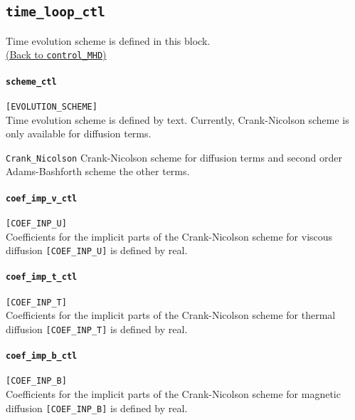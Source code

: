 \subsection{\tt time\_loop\_ctl}
\label{href_t:time_loop_ctl}
Time evolution scheme is defined in this block. \\
\hyperref[href_i:time_loop_ctl]{(Back to {\tt control\_MHD})}

\paragraph{\tt scheme\_ctl}
\label{href_t:scheme_ctl}
\verb|[EVOLUTION_SCHEME]| \\
Time evolution scheme is defined by text. Currently, Crank-Nicolson scheme is only available for diffusion terms.
%
\begin{description}
\item{\tt Crank\_Nicolson} Crank-Nicolson scheme for diffusion terms and second order Adams-Bashforth scheme the other terms.
\end{description}
%

\paragraph{\tt coef\_imp\_v\_ctl}
\label{href_t:coef_imp_v_ctl}
\verb|[COEF_INP_U]| \\
Coefficients for the implicit parts of the Crank-Nicolson scheme for viscous diffusion \verb|[COEF_INP_U]| is defined by real.

\paragraph{\tt coef\_imp\_t\_ctl}
\label{href_t:coef_imp_t_ctl}
\verb|[COEF_INP_T]| \\
Coefficients for the implicit parts of the Crank-Nicolson scheme for thermal diffusion \verb|[COEF_INP_T]| is defined by real.

\paragraph{\tt coef\_imp\_b\_ctl}
\label{href_t:coef_imp_b_ctl}
\verb|[COEF_INP_B]| \\
Coefficients for the implicit parts of the Crank-Nicolson scheme for magnetic diffusion \verb|[COEF_INP_B]| is defined by real.

